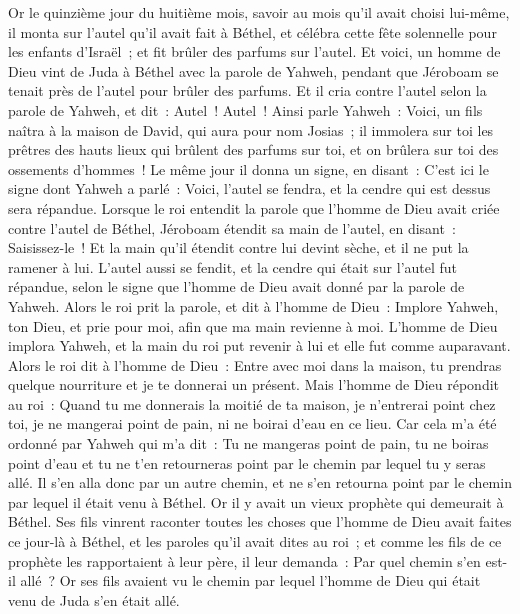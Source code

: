 \begin{multicols}{2}
Or le quinzième jour du huitième mois, savoir au mois qu'il avait choisi lui-même, il monta sur l'autel qu'il avait fait à Béthel, et célébra cette fête solennelle pour les enfants d'Israël~; et fit brûler des parfums sur l'autel.
\VerseOne{}Et voici, un homme de Dieu vint de Juda à Béthel avec la parole de Yahweh, pendant que Jéroboam se tenait près de l'autel pour brûler des parfums.
Et il cria contre l'autel selon la parole de Yahweh, et dit~: Autel~! Autel~! Ainsi parle Yahweh~: Voici, un fils naîtra à la maison de David, qui aura pour nom Josias~; il immolera sur toi les prêtres des hauts lieux qui brûlent des parfums sur toi, et on brûlera sur toi des ossements d'hommes~!
Le même jour il donna un signe, en disant~: C'est ici le signe dont Yahweh a parlé~: Voici, l'autel se fendra, et la cendre qui est dessus sera répandue.
Lorsque le roi entendit la parole que l'homme de Dieu avait criée contre l'autel de Béthel, Jéroboam étendit sa main de l'autel, en disant~: Saisissez-le~! Et la main qu'il étendit contre lui devint sèche, et il ne put la ramener à lui.
L'autel aussi se fendit, et la cendre qui était sur l'autel fut répandue, selon le signe que l'homme de Dieu avait donné par la parole de Yahweh.
Alors le roi prit la parole, et dit à l'homme de Dieu~: Implore Yahweh, ton Dieu, et prie pour moi, afin que ma main revienne à moi. L'homme de Dieu implora Yahweh, et la main du roi put revenir à lui et elle fut comme auparavant.
Alors le roi dit à l'homme de Dieu~: Entre avec moi dans la maison, tu prendras quelque nourriture et je te donnerai un présent.
Mais l'homme de Dieu répondit au roi~: Quand tu me donnerais la moitié de ta maison, je n'entrerai point chez toi, je ne mangerai point de pain, ni ne boirai d'eau en ce lieu.
Car cela m'a été ordonné par Yahweh qui m'a dit~: Tu ne mangeras point de pain, tu ne boiras point d'eau et tu ne t'en retourneras point par le chemin par lequel tu y seras allé.
Il s'en alla donc par un autre chemin, et ne s'en retourna point par le chemin par lequel il était venu à Béthel.
Or il y avait un vieux prophète qui demeurait à Béthel. Ses fils vinrent raconter toutes les choses que l'homme de Dieu avait faites ce jour-là à Béthel, et les paroles qu'il avait dites au roi~; et comme les fils de ce prophète les rapportaient à leur père,
il leur demanda~: Par quel chemin s'en est-il allé~? Or ses fils avaient vu le chemin par lequel l'homme de Dieu qui était venu de Juda s'en était allé.

\end{multicols}
